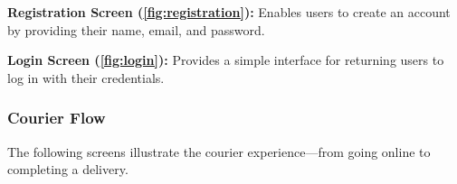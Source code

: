 \noindent\textbf{Registration Screen (\ref{fig:registration}):}  
Enables users to create an account by providing their name, email, and password.

\noindent\textbf{Login Screen (\ref{fig:login}):}  
Provides a simple interface for returning users to log in with their credentials.

\subsubsection{Courier Flow}

The following screens illustrate the courier experience—from going online to completing a delivery.

\begin{figure}[H]
    \centering
    \begin{subfigure}[b]{0.48\textwidth}
        \centering

\end{subfigure}
\end{figure}
